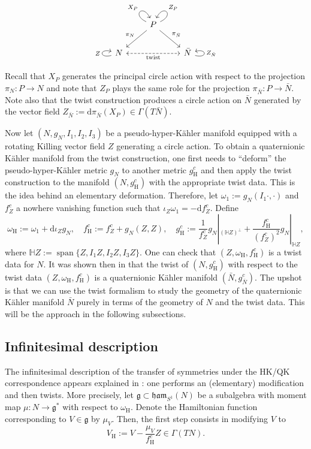 \documentclass{article}
\theoremstyle{definition}
\DeclareMathOperator{\spn}{span}
\newcommand{\frg}{\mathfrak{g}}
\newcommand{\hor}{\mathrm{H}}
\renewcommand{\d}{\mathrm{d}}
\begin{document}
    $$\begin{tikzcd}
    & P \arrow[ld, "\pi_N"'] \arrow[rd, "\pi_{\bar N}"] \arrow[<-, out=65, in=25, loop, "Z_P"] \arrow[out=155, in=115, loop, "X_P"] & \\
    N \arrow[loop left, "Z"] \arrow[rr, <->, "\mathrm{twist}"', dashed] && \bar{N} \arrow[<-, loop right, "Z_{\bar N}"]
    \end{tikzcd}$$

    Recall that $X_P$ generates the principal circle action with respect to the projection $\pi_N:P\longrightarrow N$ and note that $Z_P$ plays the same role for the projection $\pi_{\bar N}:P\longrightarrow\bar N$. Note also that the twist construction produces a circle action on $\bar N$ generated by the vector field $Z_{\bar N}:=\d\pi_{\bar N}(X_P)\in\Gamma(T\bar N)$.\medskip

    Now let $(N,g_N,I_1,I_2,I_3)$ be a pseudo-hyper-K\"ahler manifold equipped with a rotating Killing vector field $Z$ generating a circle action. To obtain a quaternionic K\"ahler manifold from the twist construction, one first needs to ``deform'' the pseudo-hyper-K\"ahler metric $g_N$ to another metric $g_\hor^c$ and then apply the twist construction to the manifold $(N,g_\hor^c)$ with the appropriate twist data. This is the idea behind an elementary deformation. Therefore, let $\omega_1:=g_N(I_1\cdot,\cdot)$ and $f_Z^c$ a nowhere vanishing function such that $\iota_Z\omega_1=-\d f_Z^c$. Define $$\omega_\hor:=\omega_1+\d\iota_Zg_N,\quad f_\hor^c:=f_Z^c+g_N(Z,Z),\quad g_\hor^c:=\frac{1}{f_Z^c}g_N|_{(\mathbb{H}Z)^\perp}+\frac{f_\hor^c}{(f_Z^c)^2}g_N|_{\mathbb{H}Z},$$ where $\mathbb{H}Z:=\spn\{Z,I_1Z,I_2Z,I_3Z\}$. One can check that $(Z,\omega_\hor,f_\hor^c)$ is a twist data for $N$. It was shown then in \cite{MS15} that the twist of $(N,g_\hor^c)$ with respect to the twist data $(Z,\omega_\hor,f_\hor^c)$ is a quaternionic K\"ahler manifold $(\bar N,g_{\bar N}^c)$. The upshot is that we can use the twist formalism to study the geometry of the quaternionic K\"ahler manifold $\bar N$ purely in terms of the geometry of $N$ and the twist data. This will be the approach in the following subsections.
    
    \subsection{Infinitesimal description}
	
    The infinitesimal description of the transfer of symmetries under the HK/QK correspondence appears explained in \cite{CST21}: one performs an (elementary) modification and then twists. More precisely, let $\frg\subset\mathfrak{ham}_{S^1}(N)$ be a subalgebra with moment map $\mu:N\longrightarrow\frg^*$ with respect to $\omega_\hor$. Denote the Hamiltonian function corresponding to $V\in\frg$ by $\mu_V$. Then, the first step consists in modifying $V$ to $$V_\hor:=V-\frac{\mu_V}{f_\hor^c}Z\in\Gamma(TN).$$
	
\end{document}
